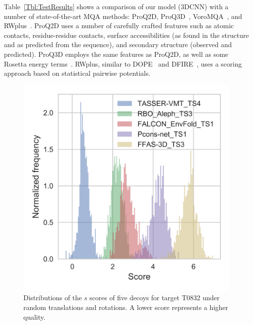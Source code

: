 \documentclass{bioinfo}
\begin{document}
Table~\ref{Tbl:TestResults} shows a comparison of our model (3DCNN)
with a number of state-of-the-art MQA methods: ProQ2D,
ProQ3D~\citep{uziela2017proq3d},
VoroMQA~\citep{olechnovivc2017voromqa}, and
RWplus~\citep{zhang2010novel}.
%
ProQ2D uses a number of carefully crafted features such as atomic
contacts, residue-residue contacts, surface accessibilities (as found
in the structure and as predicted from the sequence), and secondary
structure (observed and predicted). ProQ3D employs the same features
as ProQ2D, as well as some Rosetta energy
terms~\citep{leaverfay2011rosetta}.
%
RWplus, similar to DOPE~\citep{shen2006statistical} and
DFIRE~\citep{zhou2002distance}, uses a scoring approach based on
statistical pairwise potentials.
%
\begin{figure}[t]
    \centerline{\includegraphics[width=0.7\linewidth]{image5}}
    \vspace{-15pt}
    \caption{Distributions of the $s$ scores of five decoys for target
    T0832 under random translations and rotations. A lower score
    represents a higher quality.}
    \label{Fig:DecoysScoreDistribution}
\end{figure}
%
\end{document}
